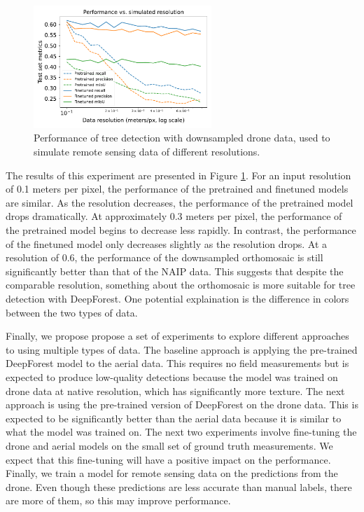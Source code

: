 \begin{figure}
    \centering
    \includegraphics[width=0.6\textwidth]{figs/results/tree_detections/simulated_RS_metrics.pdf}
    \caption{Performance of tree detection with downsampled drone data, used to simulate remote sensing data of different resolutions.}
    \label{fig:results:downsampled_tree_det_resolution}
\end{figure}

The results of this experiment are presented in Figure \ref{fig:results:downsampled_tree_det_resolution}. For an input resolution of 0.1 meters per pixel, the performance of the pretrained and finetuned models are similar. As the resolution decreases, the performance of the pretrained model drops dramatically. At approximately 0.3 meters per pixel, the performance of the pretrained model begins to decrease less rapidly. In contrast, the performance of the finetuned model only decreases slightly as the resolution drops. At a resolution of 0.6, the performance of the downsampled orthomosaic is still significantly better than that of the NAIP data. This suggests that despite the comparable resolution, something about the orthomosaic is more suitable for tree detection with DeepForest. One potential explaination is the difference in colors between the two types of data.

Finally, we propose  propose a set of experiments to explore different approaches to using multiple types of data. The baseline approach is applying the pre-trained DeepForest model to the aerial data. This requires no field measurements but is expected to produce low-quality detections because the model was trained on drone data at native resolution, which has significantly more texture. The next approach is using the pre-trained version of DeepForest on the drone data. This is expected to be significantly better than the aerial data because it is similar to what the model was trained on. The next two experiments involve fine-tuning the drone and aerial models on the small set of ground truth measurements. We expect that this fine-tuning will have a positive impact on the performance. Finally, we train a model for remote sensing data on the predictions from the drone. Even though these predictions are less accurate than manual labels, there are more of them, so this may improve performance.

